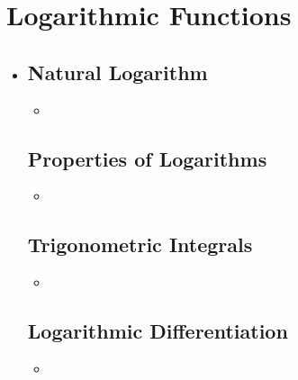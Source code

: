 \section{Logarithmic Functions}
\begin{itemize}
  \item []
  
  \subsection{Natural Logarithm}
  \begin{itemize}
    \item 
  \end{itemize}

  \subsection{Properties of Logarithms}
  \begin{itemize}
    \item 
  \end{itemize}

  \subsection{Trigonometric Integrals}
  \begin{itemize}
    \item 
  \end{itemize}

  \subsection{Logarithmic Differentiation}
  \begin{itemize}
    \item 
  \end{itemize}
  
\end{itemize}

